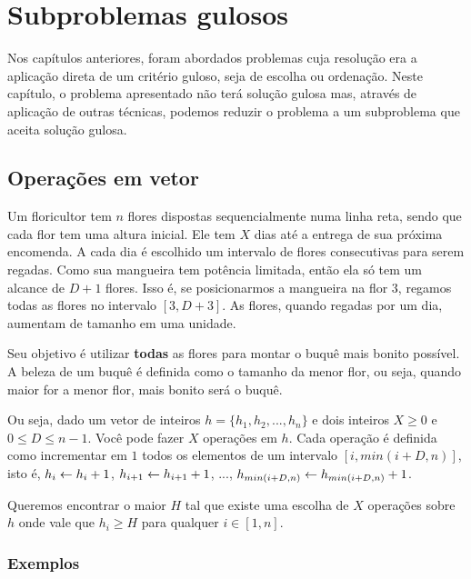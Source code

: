 \chapter{Subproblemas gulosos}
\label{subproblema}

Nos capítulos anteriores, foram abordados problemas cuja resolução era a aplicação direta de um critério guloso, seja de escolha ou ordenação. Neste capítulo, o problema apresentado não terá solução gulosa mas, através de aplicação de outras técnicas, podemos reduzir o problema a um subproblema que aceita solução gulosa.

\section{Operações em vetor}

Um floricultor tem $n$ flores dispostas sequencialmente numa linha reta, sendo que cada flor tem uma altura inicial. Ele tem $X$ dias até a entrega de sua próxima encomenda. A cada dia é escolhido um intervalo de flores consecutivas para serem regadas. Como sua mangueira tem potência limitada, então ela só tem um alcance de $D + 1$ flores. Isso é, se posicionarmos a mangueira na flor $3$, regamos todas as flores no intervalo $[3, D + 3]$.  As flores, quando regadas por um dia, aumentam de tamanho em uma unidade.

Seu objetivo é utilizar \textbf{todas} as flores para montar o buquê mais bonito possível. A beleza de um buquê é definida como o tamanho da menor flor, ou seja, quando maior for a menor flor, mais bonito será o buquê.

Ou seja, dado um vetor de inteiros $h = \{h_1, h_2, ..., h_n\}$ e dois inteiros $X \geq 0$ e $0 \leq D \leq n - 1$. Você pode fazer $X$ operações em $h$. Cada operação é definida como incrementar em $1$ todos os elementos de um intervalo $[i, min(i + D, n)]$, isto é, $h_i \leftarrow h_i + 1$, $h_{i + 1} \leftarrow h_{i + 1} + 1$, ..., $h_{min(i + D, n)} \leftarrow h_{min(i + D, n)} + 1$.

Queremos encontrar o maior $H$ tal que existe uma escolha de $X$ operações sobre $h$ onde vale que $h_i \geq H$ para qualquer $i \in [1, n]$.

\subsection*{Exemplos}

